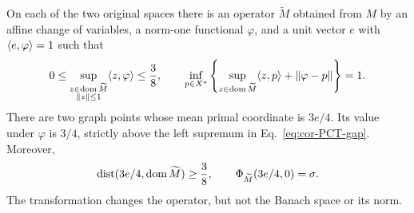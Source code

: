 \begin{corollary}\label{cor:two-row}
On each of the two original spaces there is an operator $\widetilde M$
obtained from $M$ by an affine change of variables, a norm-one functional $\varphi$, and a
unit vector $e$ with $\langle e,\varphi\rangle=1$ such that
\begin{equation}
0\le \sup_{\substack{z\in\operatorname{dom}\widetilde M\\\|z\|\le1}}
\langle z,\varphi\rangle\le\frac38,
\qquad
\inf_{p\in X^*}\left\{
\sup_{z\in\operatorname{dom}\widetilde M}\langle z,p\rangle+\|\varphi-p\|
\right\}=1.
\label{eq:cor-PCT-gap}
\end{equation}
There are two graph points whose mean primal coordinate is $3e/4$.
Its value under $\varphi$ is $3/4$, strictly above the left supremum in
Eq.~\eqref{eq:cor-PCT-gap}. Moreover,
\begin{equation}
\operatorname{dist}(3e/4,\operatorname{dom}\widetilde M)\ge\frac38,
\qquad \Phi_{\widetilde M}(3e/4,0)=\sigma.
\label{eq:cor-finite-projection-hole}
\end{equation}
The transformation changes the operator, but not the Banach space or
its norm.
\end{corollary}
